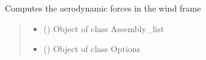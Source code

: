 \documentclass[letterpaper,10pt,english]{sphinxmanual}
\begin{document}
\begin{fulllineitems}
\label{\detokenize{modules:forces.compute_aerodynamic_forces}}
\pysigstartsignatures
{}
\pysigstopsignatures
\sphinxAtStartPar
Computes the aerodynamic forces in the wind frame
\begin{quote}\begin{description}
\begin{itemize}
\item {} 
\sphinxAtStartPar
{} ({\hyperref[\detokenize{modules:assembly.Assembly_list}]{}}) \textendash{} Object of class Assembly\_list

\item {} 
\sphinxAtStartPar
{} ({\hyperref[\detokenize{modules:configuration.Options}]{}}) \textendash{} Object of class Options

\end{itemize}

\end{description}\end{quote}

\end{fulllineitems}

\end{document}
